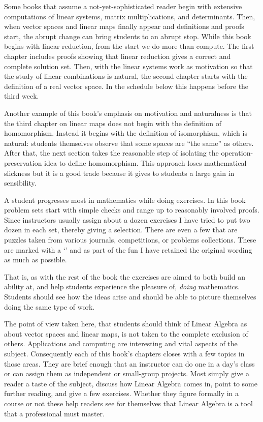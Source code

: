 {Some books that assume a not-yet-sophisticated reader
begin with extensive computations of linear systems, 
matrix multiplications, 
and determinants.
Then, when 
vector spaces and linear maps finally appear
and definitions and proofs start, the abrupt change
can bring students to an abrupt stop.
While this book begins with
linear reduction, from the start
we do more than compute.
The first chapter
includes proofs showing that linear reduction gives a correct and
complete solution set.
Then, with the linear systems work as motivation
so that the study of linear combinations is natural,
the second chapter starts with the definition of a real vector space.
In the schedule below this happens before the third week.

Another example of this book's emphasis on motivation and naturalness
is that the third chapter on linear maps
does not begin with the definition of homomorphism.
Instead it begins with the definition of isomorphism, which
is natural: students themselves
observe that some spaces are ``the same'' as others.
After that,
the next section takes the reasonable step of 
isolating the operation-preservation idea
to define homomorphism.
This approach loses mathematical slickness 
but it is a good trade because it gives to students
a large gain in sensibility.

A student progresses most in mathematics while doing exercises. 
In this book problem sets start with 
simple checks and range up to reasonably involved proofs.
Since instructors usually assign about a dozen exercises
I have tried to put two dozen in each set, 
thereby giving a selection.
There are even a few that are puzzles
taken from various journals, competitions, or
problems collections. 
These are marked with a
`\puzzlemark' and 
as part of the fun I have retained the original wording
as much as possible.

That is, as with the rest of the book 
the exercises are aimed to both build an ability at,
and help students experience the pleasure of, 
\emph{doing} mathematics.
Students should see how the ideas arise and should be able to 
picture themselves doing the same type of work.


\medskip
{}
The point of view taken here, that students should think of 
Linear Algebra as about vector spaces
and linear maps, is not taken to the complete exclusion of others.
Applications and computing are interesting and vital aspects 
of the subject.
Consequently each of this book's chapters closes with a few 
topics in those areas.
They are brief enough that an instructor can do one
in a day's class 
or can assign them as independent or small-group projects.
Most simply give a reader
a taste of the subject, discuss how Linear Algebra comes in,
point to some further reading, and give a few exercises. 
Whether they figure formally in a course or not these help
readers see for themselves that Linear Algebra is a tool
that a professional must master. 




}
